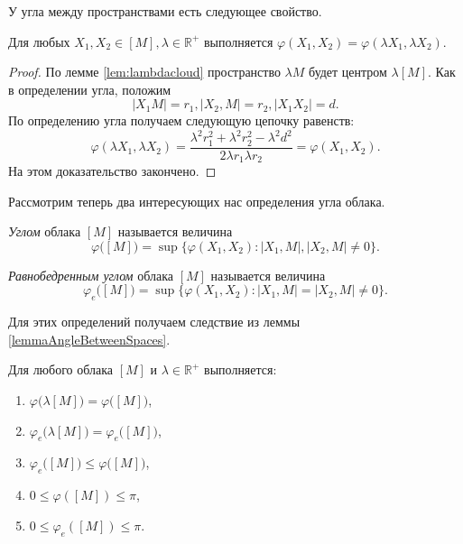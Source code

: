 У угла между пространствами есть следующее свойство.
\begin{lemma}
  \label{lemmaAngleBetweenSpaces} Для любых \( X_1, X_2 \in [M], \lambda
  \in\mathbb{R}^+ \) выполняется \( \varphi (X_1, X_2) = \varphi (\lambda
      X_1,
  \lambda X_2) \).
\end{lemma}
\begin{proof}
  По лемме \ref{lem:lambdacloud} пространство \( \lambda M \) будет
  центром \( \lambda
    [M]
  \). Как в определении угла, положим \[ |X_1 M| = r_1, | X_2, M | =r_2,
    |X_1
  X_2| = d.\] По определению угла получаем следующую цепочку
  равенств: \[ \varphi (\lambda X_1, \lambda X_2) = \frac{\lambda
    ^{2} r_1^2 + \lambda ^2 r_2^2 - \lambda^2 d^2}{2 \lambda  r_1
    \lambda r_2} =
    \varphi (X_1, X_2).
  \]
  На этом доказательство закончено.
\end{proof}
Рассмотрим теперь два интересующих нас определения угла облака.
\begin{definition}
  \emph{Углом} облака $ [M] $ называется величина
  \[
    \varphi \big([M]\big)= \sup \big\{\varphi (X_1, X_2) \colon | X_1,M
    |, |X_2,M| \neq 0\big\}.
  \]
\end{definition}
\begin{definition}
  \emph{Равнобедренным углом} облака $ [M] $ называется величина
  \[
    \varphi_e \big([M]\big) = \sup \big\{\varphi (X_1, X_2) \colon |X_1,M |
    = |X_2,M| \neq 0\big\}.
  \]
\end{definition}
Для этих определений получаем следствие из леммы \ref{lemmaAngleBetweenSpaces}.
\begin{lemma}
  Для любого облака \( [M] \) и \( \lambda \in\mathbb{R}^+ \)
  выполняется\textup{:}\label{lem:angles}
  \begin{enumerate}
    \item \(\varphi \big(\lambda [M]\big) = \varphi
      \big([M]\big)\),\label{lem:angles:1}
    \item \(\varphi_e \big(\lambda [M]\big) = \varphi_e
      \big([M]\big)\),\label{lem:angles:2}
    \item \( \varphi_e \big([M]\big) \le \varphi \big([M]\big)
      \),\label{lem:angles:3}
    \item \(0 \le \varphi ([M]) \le \pi\),\label{lem:angles:4}
    \item \(0 \le \varphi_e ([M]) \le \pi\).\label{lem:angles:5}
  \end{enumerate}
\end{lemma}

